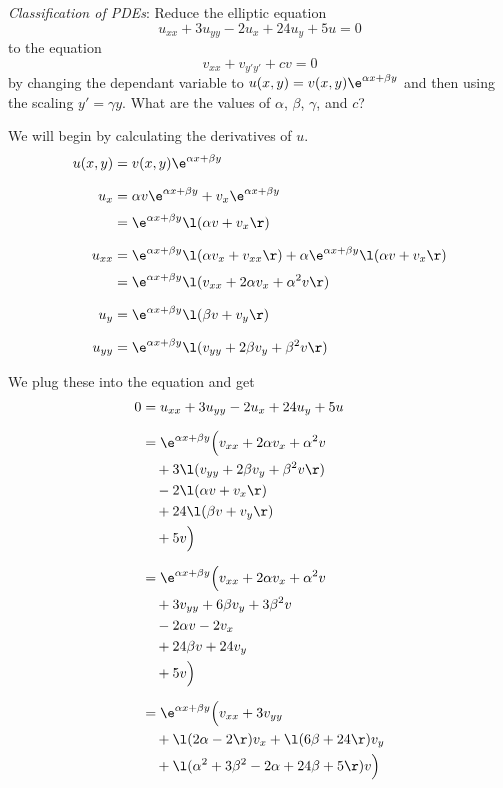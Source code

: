 \documentclass[a4paper]{article}
\begin{document}


\begin{questionbody}
\textit{Classification of PDEs}: Reduce the elliptic equation \[
u_{xx} + 3 u_{yy} - 2 u_x + 24 u_y + 5u = 0
\] to the equation \[
v_{xx} + v_{y' y'} + cv = 0
\] by changing the dependant variable to $u(x, y) = v(x, y) \e^{\alpha x + \beta y}$ and then using the scaling $y' = \gamma y$. What are the values of $\alpha$, $\beta$, $\gamma$, and $c$?
\end{questionbody}

We will begin by calculating the derivatives of $u$.
\begin{align*}
u(x, y) &= v(x, y) \e^{\alpha x + \beta y} \\[1.5ex]
%
u_x &= \alpha v \e^{\alpha x + \beta y} + v_x \e^{\alpha x + \beta y} \\[0.5ex]
&= \e^{\alpha x + \beta y} \l( \alpha v + v_x \r) \\[1.5ex]
%
u_{xx} &= \e^{\alpha x + \beta y} \l( \alpha v_x + v_{xx} \r) + \alpha \e^{\alpha x + \beta y} \l( \alpha v + v_x \r) \\[0.5ex]
&= \e^{\alpha x + \beta y} \l( v_{xx} + 2\alpha v_x + \alpha^2 v \r) \\[1.5ex]
%
u_y &= \e^{\alpha x + \beta y} \l( \beta v + v_y \r) \\[1.5ex]
%
u_{yy} &= \e^{\alpha x + \beta y} \l( v_{yy} + 2\beta v_y + \beta^2 v \r)
\end{align*}

We plug these into the equation and get \[ \begin{split}
0 &= u_{xx} + 3 u_{yy} - 2 u_x + 24 u_y + 5u \\[1.5ex]
&= \e^{\alpha x + \beta y} \Big(
    v_{xx} + 2\alpha v_x + \alpha^2 v \\
    &\quad + 3 \l( v_{yy} + 2\beta v_y + \beta^2 v \r) \\
    &\quad - 2 \l( \alpha v + v_x \r) \\
    &\quad + 24 \l( \beta v + v_y \r) \\
    &\quad + 5v
\Big) \\[1.5ex]
&= \e^{\alpha x + \beta y} \Big(
    v_{xx} + 2 \alpha v_x + \alpha^2 v \\
    &\quad + 3 v_{yy} + 6 \beta v_y + 3 \beta^2 v \\
    &\quad - 2 \alpha v - 2 v_x \\
    &\quad + 24 \beta v + 24 v_y \\
    &\quad + 5v
\Big) \\[1.5ex]
&= \e^{\alpha x + \beta y} \Big(
    v_{xx} + 3 v_{yy} \\
    &\quad + \l( 2\alpha - 2 \r) v_x + \l( 6\beta + 24 \r) v_y \\
    &\quad + \l( \alpha^2 + 3\beta^2 - 2\alpha + 24\beta + 5 \r) v
\Big)
\end{split} \]
\end{document}
